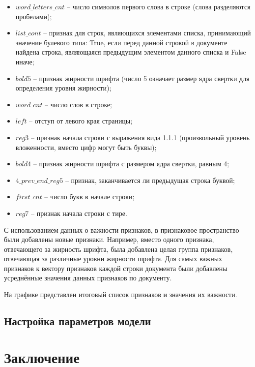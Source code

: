 \documentclass[a4paper,12pt]{article}
\begin{document}
\begin{itemize}

	\item $word\_letters\_cnt$ -- число символов первого слова в строке (слова разделяются пробелами);
	\item $list\_cont$ -- признак для строк, являющихся элементами списка, принимающий значение булевого типа: True, если перед данной строкой в документе найдена строка, являющаяся предыдущим элементом данного списка и False иначе;
	\item $bold5$ -- признак жирности шрифта (число 5 означает размер ядра свертки для определения уровня жирности);
	\item $word\_cnt$ -- число слов в строке;
	\item $left$ -- отступ от левого края страницы;
	\item $reg3$ -- признак начала строки с выражения вида 1.1.1 (произвольный уровень вложенности, вместо цифр могут быть буквы);
	\item $bold4$ -- признак жирности шрифта с размером ядра свертки, равным 4;
	\item $4\_prev\_end\_reg5$ -- признак, заканчивается ли предыдущая строка буквой;
	\item $first\_cnt$ -- число букв в начале строки;
	\item $reg7$ -- признак начала строки с тире.

\end{itemize}

С использованием данных о важности признаков, в признаковое пространство были добавлены новые признаки. Например, вместо одного признака, отвечающего за жирность шрифта, была добавлена целая группа признаков, отвечающая за различные уровни жирности шрифта. Для самых важных признаков к вектору признаков каждой строки документа были добавлены усреднённые значения данных признаков по документу.

На графике представлен итоговый список признаков и значения их важности.

\subsection{Настройка параметров модели}



\newpage
\section{Заключение}
\end{document}
